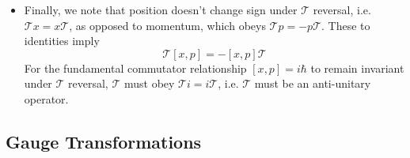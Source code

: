 \documentclass[11pt, a4paper]{article}
\newcommand{\T}{\mathcal{T}}  %
\begin{document}
\begin{itemize}
	\item Finally, we note that position doesn't change sign under $ \T $ reversal, i.e. $ \T x = x \T $, as opposed to momentum, which obeys $ \T p = - p \T $. These to identities imply
	\begin{equation*}
		\T[x, p] = - [x, p]\T
	\end{equation*}
	For the fundamental commutator relationship $ [x, p] = i\hbar $ to remain invariant under $ \T $ reversal, $ \T $ must obey $ \T i = i \T $, i.e. $ \T $ must be an anti-unitary operator.
	
\end{itemize}

\subsection{Gauge Transformations}
\end{document}
